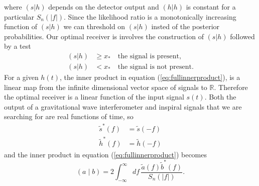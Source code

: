 where $(s|h)$ depends on the detector output and $(h|h)$ is constant for a
particular $S_n(|f|)$. Since the likelihood ratio is a monotonically
increasing function of $(s|h)$ we can threshold on $(s|h)$ insted of the
posterior probabilities. Our optimal receiver is involves the construction of
$(s|h)$ followed by a test
\begin{equation}
\begin{split}
(s|h) &\ge x_\ast \quad \text{the signal is present}, \\
(s|h) &< x_\ast \quad \text{the signal is not present}.
\end{split}
\end{equation}
For a given $h(t)$, the inner
product in equation (\ref{eq:fullinnerproduct}), is a linear map from the
infinite dimensional vector space of signals to $\mathbb{R}$. Therefore the
optimal receiver is a linear function of the input signal $s(t)$. Both the
output of a gravitational wave interferometer and inspiral signals that we are
searching for are real functions of time, so 
\begin{align}
\tilde{s}^\ast(f) &= \tilde{s}(-f) \\
\tilde{h}^\ast(f) &= \tilde{h}(-f)
\end{align}
and the inner product in equation (\ref{eq:fullinnerproduct}) becomes
\begin{equation}
\left(a\mid b\right) = 2 \int_{-\infty}^{\infty}df\,
\frac{\tilde{a}(f)\tilde{b}^\ast(f)}{S_n\left(\left|f\right|\right)}.
\label{eq:innerproduct}
\end{equation}

